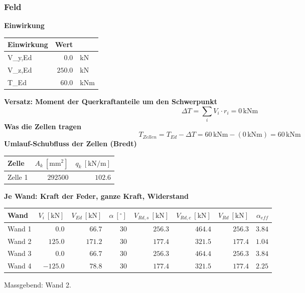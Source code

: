 \documentclass[11pt,a4paper]{article}
\begin{document}
\subsubsection{Feld}
\noindent\textbf{Einwirkung}
\begin{longtable}{lrl}
\hline
Einwirkung & Wert &  \\
\hline
\endhead
V\_y,Ed & $0.0$ & kN \\
V\_z,Ed & $250.0$ & kN \\
T\_Ed & $60.0$ & kNm \\
\hline
\end{longtable}
\noindent\textbf{Versatz: Moment der Querkraftanteile um den Schwerpunkt}
\begin{equation*}
\Delta T = \sum_i V_i \cdot r_i = 0\,\mathrm{kNm}
\end{equation*}
\noindent\textbf{Was die Zellen tragen}
\begin{equation*}
T_{Zellen} = T_{Ed} - \Delta T = 60\,\mathrm{kNm} - \left(0\,\mathrm{kNm}\right) = 60\,\mathrm{kNm}
\end{equation*}
\noindent\textbf{Umlauf-Schubfluss der Zellen (Bredt)}
\begin{longtable}{lrr}
\hline
Zelle & $A_k\ [\mathrm{mm}^2]$ & $q_k\ [\mathrm{kN/m}]$ \\
\hline
\endhead
Zelle 1 & $292500$ & $102.6$ \\
\hline
\end{longtable}
\noindent\textbf{Je Wand: Kraft der Feder, ganze Kraft, Widerstand}
\begin{longtable}{lrrrrrrr}
\hline
Wand & $V_i\ [\mathrm{kN}]$ & $V_{Ed}\ [\mathrm{kN}]$ & $\alpha\ [{}^{\circ}]$ & $V_{Rd,s}\ [\mathrm{kN}]$ & $V_{Rd,c}\ [\mathrm{kN}]$ & $V_{Rd}\ [\mathrm{kN}]$ & $\alpha_{eff}$ \\
\hline
\endhead
Wand 1 & $0.0$ & $66.7$ & $30$ & $256.3$ & $464.4$ & $256.3$ & $3.84$ \\
Wand 2 & $125.0$ & $171.2$ & $30$ & $177.4$ & $321.5$ & $177.4$ & $1.04$ \\
Wand 3 & $0.0$ & $66.7$ & $30$ & $256.3$ & $464.4$ & $256.3$ & $3.84$ \\
Wand 4 & $-125.0$ & $78.8$ & $30$ & $177.4$ & $321.5$ & $177.4$ & $2.25$ \\
\hline
\end{longtable}
Massgebend: Wand 2.
\end{document}
